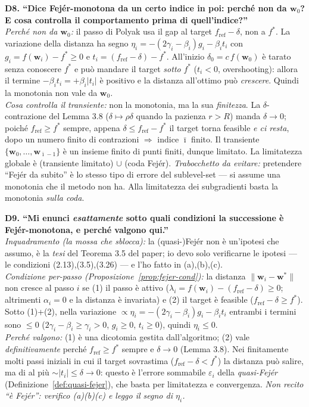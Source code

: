 \documentclass[11pt,a4paper]{article}
\theoremstyle{definition}
\newcommand{\w}{\bm{w}}
\newcommand{\wstar}{\w^{*}}
\newcommand{\fstar}{f^{*}}
\newcommand{\fref}{f_{\mathrm{ref}}}
\newcommand{\eps}{\varepsilon}
\newcommand{\norm}[1]{\lVert #1\rVert}
\begin{document}
\begin{oralbox}
\textbf{D8. ``Dice Fej\'er-monotona da un certo indice in poi: perché non da $\w_0$? E cosa
controlla il comportamento prima di quell'indice?''}\\
\emph{Perché non da $\w_0$:} il passo di Polyak usa il gap al target $\fref-\delta$, non a
$\fstar$. La variazione della distanza ha segno $\eta_i=-(2\gamma_i-\beta_i)g_i-\beta_i t_i$
con $g_i=f(\w_i)-\fstar\ge0$ e $t_i=(\fref-\delta)-\fstar$. All'inizio $\delta_0=c\,f(\w_0)$ è
tarato senza conoscere $\fstar$ e può mandare il target \emph{sotto} $\fstar$ ($t_i<0$,
overshooting): allora il termine $-\beta_i t_i=+\beta_i|t_i|$ è positivo e la distanza
all'ottimo può \emph{crescere}. Quindi la monotonia non vale da $\w_0$.
\\[3pt]
\emph{Cosa controlla il transiente:} non la monotonia, ma la sua \emph{finitezza}. La
$\delta$-contrazione del Lemma 3.8 ($\delta\mapsto\rho\delta$ quando la pazienza $r>R$) manda
$\delta\to0$; poiché $\fref\ge\fstar$ sempre, appena $\delta\le\fref-\fstar$ il target torna
feasible \emph{e ci resta}, dopo un numero finito di contrazioni $\Rightarrow$ indice
$\bar\imath$ finito. Il transiente $\{\w_0,\dots,\w_{\bar\imath-1}\}$ è un insieme finito di
punti finiti, dunque limitato. La limitatezza globale è (transiente limitato) $\cup$ (coda
Fej\'er). \emph{Trabocchetto da evitare:} pretendere ``Fej\'er da subito'' è lo stesso tipo di
errore del sublevel-set --- si assume una monotonia che il metodo non ha. Alla limitatezza dei
subgradienti basta la monotonia \emph{sulla coda}.
\end{oralbox}

\begin{oralbox}
\textbf{D9. ``Mi enunci \emph{esattamente} sotto quali condizioni la successione è
Fej\'er-monotona, e perché valgono qui.''}\\
\emph{Inquadramento (la mossa che sblocca):} la (quasi-)Fej\'er non è un'ipotesi che assumo, è
la \emph{tesi} del Teorema 3.5 del paper; io devo solo verificarne le ipotesi --- le condizioni
(2.13),(3.5),(3.26) --- e l'ho fatto in (a),(b),(c).
\\[3pt]
\emph{Condizione per-passo (Proposizione~\ref{prop:fejer-cond}):} la distanza
$\norm{\w_i-\wstar}$ non cresce al passo $i$ se (1) il passo è attivo
($\lambda_i=f(\w_i)-(\fref-\delta)\ge0$; altrimenti $\alpha_i=0$ e la distanza è invariata) e
(2) il target è feasible ($\fref-\delta\ge\fstar$). Sotto (1)+(2), nella variazione
$\propto\eta_i=-(2\gamma_i-\beta_i)g_i-\beta_i t_i$ entrambi i termini sono $\le0$
($2\gamma_i-\beta_i\ge\gamma_i>0$, $g_i\ge0$, $t_i\ge0$), quindi $\eta_i\le0$.
\\[3pt]
\emph{Perché valgono:} (1) è una dicotomia gestita dall'algoritmo; (2) vale \emph{definitivamente}
perché $\fref\ge\fstar$ sempre e $\delta\to0$ (Lemma 3.8). Nei finitamente molti passi iniziali
in cui il target sovrastima ($\fref-\delta<\fstar$) la distanza può salire, ma di al più
$\sim|t_i|\le\delta\to0$: questo è l'errore sommabile $\eps_i$ della
\emph{quasi-Fej\'er} (Definizione~\ref{def:quasi-fejer}), che basta per limitatezza e
convergenza. \emph{Non recito ``è Fej\'er'': verifico (a)(b)(c) e leggo il segno di $\eta_i$.}
\end{oralbox}
\end{document}
